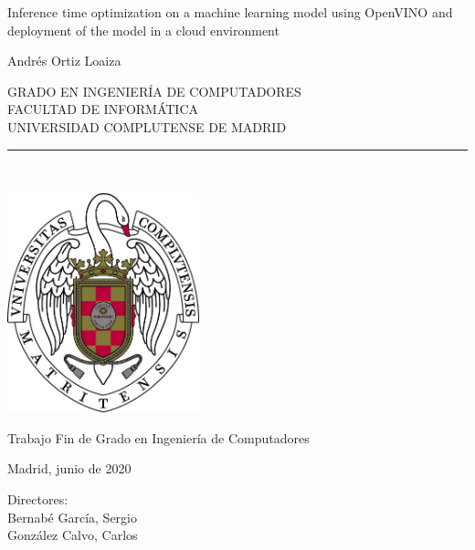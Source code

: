 \newpage


\thispagestyle{empty}


\begin{center}

    \vspace{1cm}


    {\Large Inference time optimization on a machine learning model using OpenVINO and deployment of the model in a cloud environment}\\

    \vspace{1.5cm}

    {\large Andrés Ortiz Loaiza}\\

    \vspace{1.5cm}

    GRADO EN INGENIERÍA DE COMPUTADORES\\ FACULTAD DE INFORMÁTICA\\
    UNIVERSIDAD COMPLUTENSE DE MADRID \\


    \vspace{0.65cm}
    \rule{2in}{0.5pt}\\
    \vspace{0.85cm}

    \includegraphics[height=2.5in]{images/ucm/shield2.jpg}

    \vspace{0.5cm}
    Trabajo Fin de Grado en Ingeniería de Computadores

    \vspace{0.5cm}

   Madrid, junio de 2020\\
    \vspace{3cm}

\end{center}

{\raggedleft
    Directores:\\
    \vspace{ 0.5cm}
    Bernabé García, Sergio\\
    González Calvo, Carlos\\
}